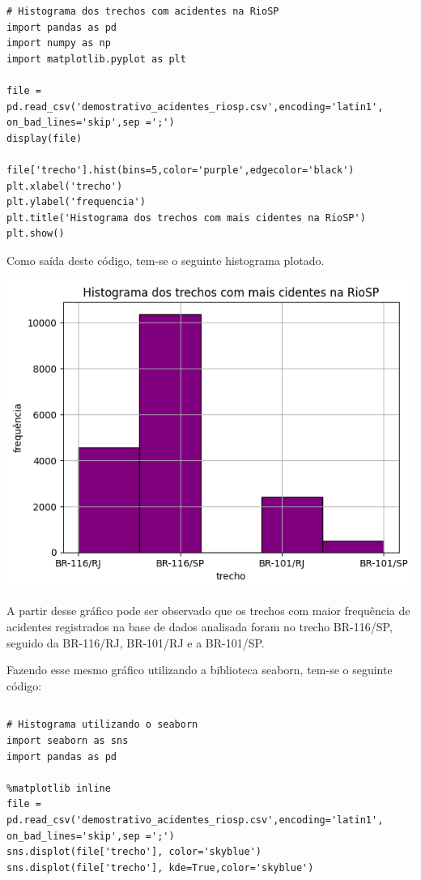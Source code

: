 \documentclass[a4paper, 12pt]{article}
\begin{document}
\begin{lstlisting} 
# Histograma dos trechos com acidentes na RioSP
import pandas as pd 
import numpy as np
import matplotlib.pyplot as plt

file = pd.read_csv('demostrativo_acidentes_riosp.csv',encoding='latin1', on_bad_lines='skip',sep =';')
display(file)

file['trecho'].hist(bins=5,color='purple',edgecolor='black')
plt.xlabel('trecho')
plt.ylabel('frequencia')
plt.title('Histograma dos trechos com mais cidentes na RioSP')
plt.show()
\end{lstlisting}
Como saída deste código, tem-se o seguinte histograma plotado.

\includegraphics[scale=0.7]{output03.png}

A partir desse gráfico pode ser observado que os trechos com maior frequência de acidentes registrados na base de dados analisada foram no trecho BR-116/SP, seguido da BR-116/RJ, BR-101/RJ e a BR-101/SP.

Fazendo esse mesmo gráfico utilizando a biblioteca seaborn, tem-se o seguinte código:

\begin{tabular}{ccc}
\end{tabular}

\begin{lstlisting} 
# Histograma utilizando o seaborn
import seaborn as sns
import pandas as pd

%matplotlib inline
file = pd.read_csv('demostrativo_acidentes_riosp.csv',encoding='latin1', on_bad_lines='skip',sep =';')
sns.displot(file['trecho'], color='skyblue')
sns.displot(file['trecho'], kde=True,color='skyblue')

\end{lstlisting}
\end{document}
